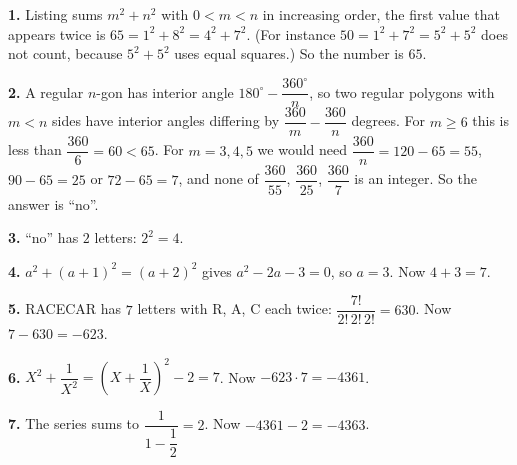 \textbf{1.} Listing sums $m^2+n^2$ with $0<m<n$ in increasing order, the first value that appears twice is $65=1^2+8^2=4^2+7^2$. (For instance $50=1^2+7^2=5^2+5^2$ does not count, because $5^2+5^2$ uses equal squares.) So the number is $65$.

\textbf{2.} A regular $n$-gon has interior angle $180^\circ-\dfrac{360^\circ}{n}$, so two regular polygons with $m<n$ sides have interior angles differing by $\dfrac{360}{m}-\dfrac{360}{n}$ degrees. For $m\ge6$ this is less than $\dfrac{360}{6}=60<65$. For $m=3,4,5$ we would need $\dfrac{360}{n}=120-65=55$, $90-65=25$ or $72-65=7$, and none of $\dfrac{360}{55}$, $\dfrac{360}{25}$, $\dfrac{360}{7}$ is an integer. So the answer is ``no''.

\textbf{3.} ``no'' has $2$ letters: $2^2=4$.

\textbf{4.} $a^2+(a+1)^2=(a+2)^2$ gives $a^2-2a-3=0$, so $a=3$. Now $4+3=7$.

\textbf{5.} RACECAR has $7$ letters with R, A, C each twice: $\dfrac{7!}{2!\,2!\,2!}=630$. Now $7-630=-623$.

\textbf{6.} $X^2+\dfrac{1}{X^2}=\left(X+\dfrac{1}{X}\right)^2-2=7$. Now $-623\cdot7=-4361$.

\textbf{7.} The series sums to $\dfrac{1}{1-\dfrac{1}{2}}=2$. Now $-4361-2=\boxed{-4363}$.

